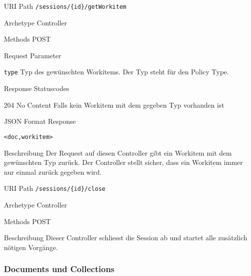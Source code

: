 \documentclass[10pt,a4paper]{scrartcl}
\begin{document}
\begin{mdframed}[style=def]
\begin{description*}
	\item[URI Path] \texttt{/sessions/\{id\}/getWorkitem}
	\item[Archetype] Controller
	\item[Methods] POST
	\item[Request Parameter] \hfill
    \begin{description*}
        \item[\texttt{type}] Typ des gewünschten Workitems. Der Typ steht für den Policy Type.
    \end{description*}
    \item[Response Statuscodes] \hfill
    \begin{description*}
        \item[204 No Content] Falls kein Workitem mit dem gegeben Typ vorhanden ist
    \end{description*}
	\item[JSON Format Response] \hfill
\begin{lstlisting}
<doc,workitem>
\end{lstlisting}
    \item[Beschreibung] Der Request auf diesen Controller gibt ein Workitem mit dem gewünschten Typ zurück. Der Controller stellt sicher, dass ein Workitem immer nur einmal zurück gegeben wird. 
\end{description*}
\end{mdframed}


\begin{mdframed}[style=def]
\begin{description*}
	\item[URI Path] \texttt{/sessions/\{id\}/close}
	\item[Archetype] Controller
	\item[Methods] POST
    \item[Beschreibung] Dieser Controller schliesst die Session ab und startet alle zusätzlich nötigen Vorgänge.
\end{description*}
\end{mdframed}

\pagebreak
\subsubsection{Documents und Collections}
\end{document}
